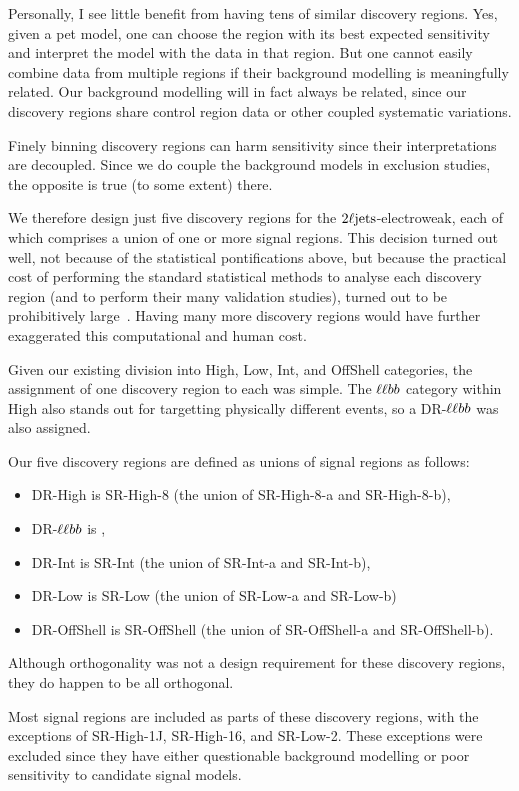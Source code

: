 Personally, I see little benefit from having tens of similar discovery regions.
Yes, given a pet model, one can choose the region with its best expected
sensitivity and interpret the model with the data in that region.
But one cannot easily combine data from multiple regions if their background
modelling is meaningfully related.
Our background modelling will in fact always be related, since our discovery
regions share control region data or other coupled systematic variations.

Finely binning discovery regions can harm sensitivity since their
interpretations are decoupled.
Since we do couple the background models in exclusion studies,
the opposite is true (to some extent) there.

We therefore design just five discovery regions for the
$2\ell\mathrm{jets}$-electroweak, each of which comprises a union of one or more
signal regions.
This decision turned out well, not because of the statistical pontifications
above, but because the practical cost of performing the standard statistical
methods to analyse each discovery region (and to perform their many validation
studies), turned out to be prohibitively large~\cite{verkerke2003roofit}.
Having many more discovery regions would have further exaggerated this
computational and human cost.

Given our existing division into High, Low, Int, and OffShell
categories, the assignment of one discovery region to each was simple.
The $\ell\ell bb$ category within High also stands out for targetting physically
different events, so a DR-$\ell\ell bb$ was also assigned.

Our five discovery regions are defined as unions of signal regions as follows:
\begin{itemize}
\item DR-High is SR-High-8 (the union of SR-High-8-a and SR-High-8-b),
\item DR-$\ell\ell bb$ is \srllbb,
\item DR-Int is SR-Int (the union of SR-Int-a and SR-Int-b),
\item DR-Low is SR-Low (the union of SR-Low-a and SR-Low-b)
\item DR-OffShell is SR-OffShell (the union of SR-OffShell-a and SR-OffShell-b).
\end{itemize}
Although orthogonality was not a design requirement for these discovery
regions, they do happen to be all orthogonal.

Most signal regions are included as parts of these discovery regions, with the
exceptions of SR-High-1J, SR-High-16, and SR-Low-2.
These exceptions were excluded since they have either questionable background
modelling or poor sensitivity to candidate signal models.

